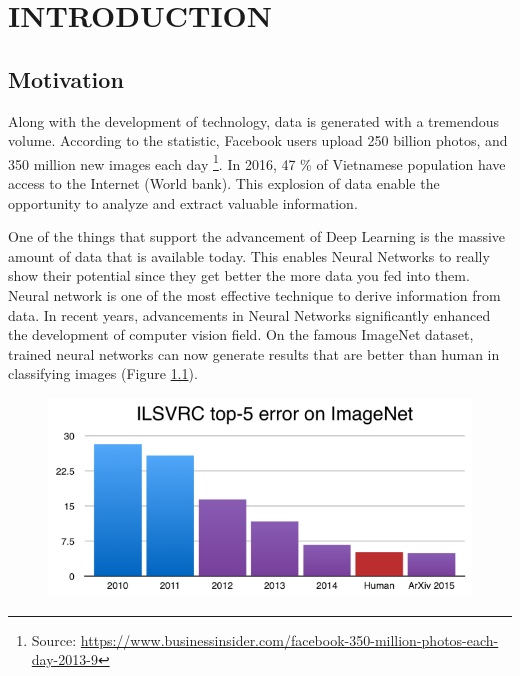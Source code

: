 \chapter{INTRODUCTION}
\label{introduction}
\section{Motivation}
Along with the development of technology, data is generated with a tremendous volume. According to the statistic, Facebook users upload 250 billion photos, and 350 million new images each day \footnote{Source: \url{https://www.businessinsider.com/facebook-350-million-photos-each-day-2013-9}}. In 2016, 47 \% of Vietnamese population have access to the Internet (World bank). This explosion of data enable the opportunity to analyze and extract valuable information.

One of the things that support the advancement of Deep Learning is the massive amount of data that is available today. This enables Neural Networks to really show their potential since they get better the more data you fed into them. Neural network is one of the most effective technique to derive information from data. In recent years, advancements in Neural Networks significantly enhanced the development of computer vision field. On the famous ImageNet  dataset, trained neural networks can now generate results that are better than human in classifying images (Figure \ref{chap3:deeplearning_vs_human}).

\begin{center}
    \begin{figure}[H]
    \centering
    \includegraphics[width=0.75\columnwidth]{images/chap3/deeplearning_vs_human.png}
    \label{chap3:deeplearning_vs_human}
    \end{figure}
\end{center}

